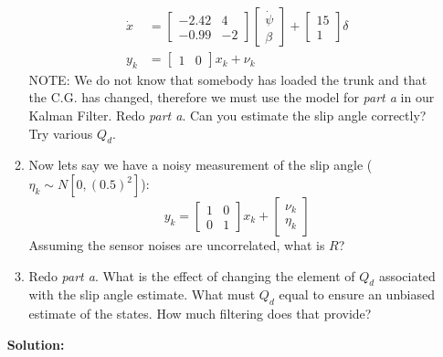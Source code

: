 \documentclass[11pt]{article}
\newcommand{\solution}{\textbf{Solution: \\}}
\begin{document}
\begin{enumerate}[label=\textbf{\arabic*.}]
\begin{enumerate}
\begin{equation*}
\begin{split}
        \dot{x} &= 
        \begin{bmatrix}
          -2.42 & 4 \\ -0.99 & -2
        \end{bmatrix}
        \begin{bmatrix}
          \dot{\psi} \\ \beta
        \end{bmatrix} 
        +
        \begin{bmatrix}
          15 \\ 1
        \end{bmatrix}
        \delta \\
        y_k &= 
        \begin{bmatrix}
          1 & 0
        \end{bmatrix}
        x_k + \nu_k
      \end{split}
    \end{equation*}
    NOTE: We do not know that somebody has loaded the trunk and that the C.G.
    has changed, therefore we must use the model for \emph{part a} in our Kalman 
    Filter. Redo \emph{part a}. Can you estimate the slip angle correctly? Try 
    various $Q_d$.
    \item Now lets say we have a noisy measurement of the slip angle ($\eta_k 
    \sim N[0,(0.5)^2]$):
    \begin{equation*}
      y_k = 
      \begin{bmatrix}
        1 & 0 \\ 0 & 1
      \end{bmatrix}
      x_k + 
      \begin{bmatrix}
        \nu_k \\ \eta_k
      \end{bmatrix}
    \end{equation*}
    Assuming the sensor noises are uncorrelated, what is $R$?
    \item Redo \emph{part a}. What is the effect of changing the element of 
    $Q_d$ associated with the slip angle estimate. What must $Q_d$ equal to 
    ensure an unbiased estimate of the states. How much filtering does that 
    provide?
  \end{enumerate}
  \solution 

\end{enumerate}
\end{document}
